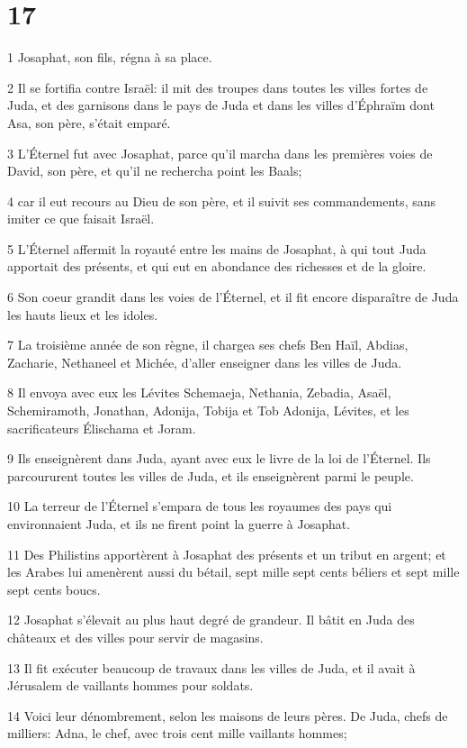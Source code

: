 \chapter{17}

\par 1 Josaphat, son fils, régna à sa place.
\par 2 Il se fortifia contre Israël: il mit des troupes dans toutes les villes fortes de Juda, et des garnisons dans le pays de Juda et dans les villes d'Éphraïm dont Asa, son père, s'était emparé.
\par 3 L'Éternel fut avec Josaphat, parce qu'il marcha dans les premières voies de David, son père, et qu'il ne rechercha point les Baals;
\par 4 car il eut recours au Dieu de son père, et il suivit ses commandements, sans imiter ce que faisait Israël.
\par 5 L'Éternel affermit la royauté entre les mains de Josaphat, à qui tout Juda apportait des présents, et qui eut en abondance des richesses et de la gloire.
\par 6 Son coeur grandit dans les voies de l'Éternel, et il fit encore disparaître de Juda les hauts lieux et les idoles.
\par 7 La troisième année de son règne, il chargea ses chefs Ben Haïl, Abdias, Zacharie, Nethaneel et Michée, d'aller enseigner dans les villes de Juda.
\par 8 Il envoya avec eux les Lévites Schemaeja, Nethania, Zebadia, Asaël, Schemiramoth, Jonathan, Adonija, Tobija et Tob Adonija, Lévites, et les sacrificateurs Élischama et Joram.
\par 9 Ils enseignèrent dans Juda, ayant avec eux le livre de la loi de l'Éternel. Ils parcoururent toutes les villes de Juda, et ils enseignèrent parmi le peuple.
\par 10 La terreur de l'Éternel s'empara de tous les royaumes des pays qui environnaient Juda, et ils ne firent point la guerre à Josaphat.
\par 11 Des Philistins apportèrent à Josaphat des présents et un tribut en argent; et les Arabes lui amenèrent aussi du bétail, sept mille sept cents béliers et sept mille sept cents boucs.
\par 12 Josaphat s'élevait au plus haut degré de grandeur. Il bâtit en Juda des châteaux et des villes pour servir de magasins.
\par 13 Il fit exécuter beaucoup de travaux dans les villes de Juda, et il avait à Jérusalem de vaillants hommes pour soldats.
\par 14 Voici leur dénombrement, selon les maisons de leurs pères. De Juda, chefs de milliers: Adna, le chef, avec trois cent mille vaillants hommes;
